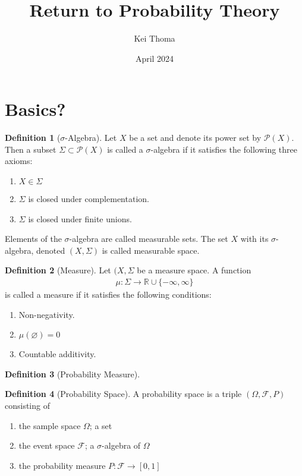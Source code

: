 \documentclass{book}
\title{Return to Probability Theory}
\author{Kei Thoma }
\date{April 2024}
\theoremstyle{definition}
\newtheorem{definition}{Definition}[]
\begin{document}
\maketitle

\section{Basics?}

\begin{definition}[\(\sigma\)-Algebra]
    Let \(X\) be a set and denote its power set by \(\mathcal{P}(X)\). Then a subset \(\Sigma \subset \mathcal{P}(X)\) is called a \(\sigma\)-algebra if it satisfies the following three axioms:
    \begin{enumerate}
        \item \(X \in \Sigma\)
        \item \(\Sigma\) is closed under complementation.
        \item \(\Sigma\) is closed under finite unions.
    \end{enumerate}
    Elements of the \(\sigma\)-algebra are called measurable sets. The set \(X\) with its \(\sigma\)-algebra, denoted \((X, \Sigma)\) is called measurable space.
\end{definition}





\begin{definition}[Measure]
    Let \((X, \Sigma\) be a measure space. A function
    \begin{align*}
        \mu: \Sigma \longrightarrow \mathbb{R} \cup \{-\infty, \infty\}
    \end{align*}
    is called a measure if it satisfies the following conditions:
    \begin{enumerate}
        \item Non-negativity.
        \item \(\mu(\varnothing) = 0\)
        \item Countable additivity.
    \end{enumerate}
\end{definition}


\begin{definition}[Probability Measure]
    
\end{definition}

\begin{definition}[Probability Space]
    A probability space is a triple \( (\Omega, \mathcal{F}, P) \) consisting of
    \begin{enumerate}
        \item the sample space \(\Omega\); a set
        \item the event space \(\mathcal{F}\); a \(\sigma\)-algebra of \(\Omega\)
        \item the probability measure \(P: \mathcal{F} \longrightarrow [0, 1]\)
    \end{enumerate}
\end{definition}
\end{document}
